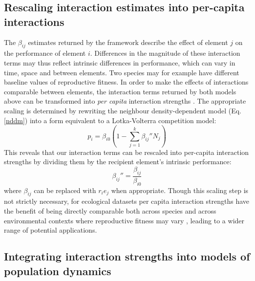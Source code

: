 \documentclass[a4,12pt]{article}
\begin{document}
    \subsection{Rescaling interaction estimates into per-capita interactions}

        The $\beta_{ij}$ estimates returned by the framework describe the effect of element $j$ on the performance of element $i$. Differences in the magnitude of these interaction terms may thus reflect intrinsic differences in performance, which can vary in time, space and between elements. Two species may for example have different baseline values of reproductive fitness. In order to make the effects of interactions comparable between elements, the interaction terms returned by both models above can be transformed into \textit{per capita} interaction strengths \parencite{Laska1998}. The appropriate scaling is determined by rewriting the neighbour density-dependent model (Eq. \ref{nddm}) into a form equivalent to a Lotka-Volterra competition model: 
        \begin{equation}
        p_{i} = \beta_{i0} \left ( 1 - \sum_{j=1}^{k} {\beta_{ij}}'' N_{j} \right )
        \label{LVform}
        \end{equation}
        This reveals that our interaction terms can be rescaled into per-capita interaction strengths by dividing them by the recipient element's intrinsic performance:  
        \begin{equation}
        {\beta_{ij}}'' = \frac{\beta_{ij}}{\beta_{i0}}
        \label{scaling}
        \end{equation}
        where $\beta_{ij}$ can be replaced with $r_i e_j$ when appropriate. Though this scaling step is not strictly necessary, for ecological datasets per capita interaction strengths have the benefit of being directly comparable both across species and across environmental contexts where reproductive fitness may vary \parencite{Wootton2005}, leading to a wider range of potential applications.

    \subsection{Integrating interaction strengths into models of population dynamics}
\end{document}
